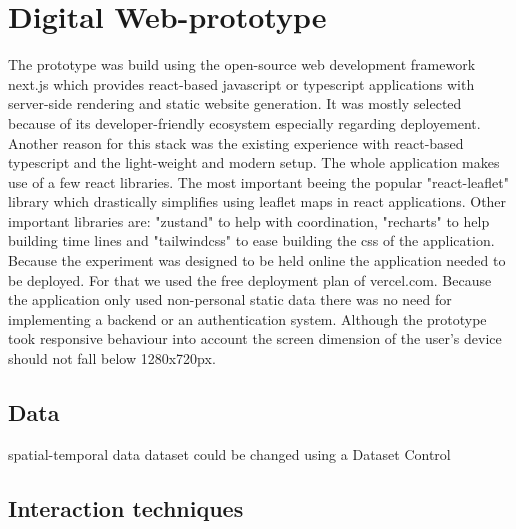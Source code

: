 \chapter{Digital Web-prototype}
The prototype was build using the open-source web development framework next.js which provides react-based javascript or
typescript applications with server-side rendering and static website generation. It was mostly selected because of its
developer-friendly ecosystem especially regarding deployement. Another reason for this stack was the existing experience
with react-based typescript and the light-weight and modern setup. The whole application makes use of a few react libraries.
The most important beeing the popular "react-leaflet" library which drastically simplifies using leaflet maps in react
applications. Other important libraries are: "zustand" to help with coordination, "recharts" to help building time lines and
"tailwindcss" to ease building the css of the application. Because the experiment was designed to be held online the
application needed to be deployed. For that we used the free deployment plan of vercel.com. Because the application only
used non-personal static data there was no need for implementing a backend or an authentication system. Although the prototype
took responsive behaviour into account the screen dimension of the user's device should not fall below 1280x720px. 
\section{Data}
spatial-temporal data
dataset could be changed using a Dataset Control
\section{Interaction techniques}

